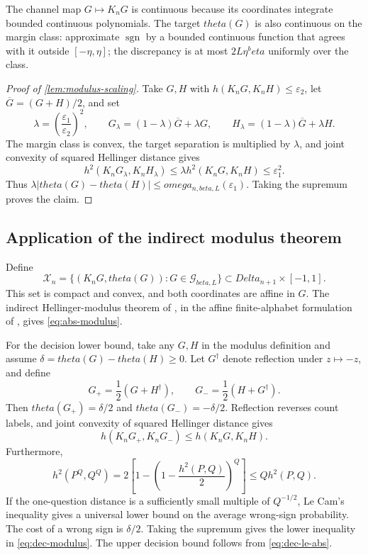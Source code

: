 \documentclass[11pt]{article}
\def\beta{beta}%
\def\theta{theta}%
\def\omega{omega}%
\def\Delta{Delta}%
\newcommand{\sgn}{\operatorname{sgn}}
\newcommand{\calG}{\mathcal G}
\newcommand{\eps}{\varepsilon}
\begin{document}
The channel map $G\mapsto K_nG$ is continuous because its coordinates integrate bounded continuous polynomials.  The target $\theta(G)$ is also continuous on the margin class: approximate $\sgn$ by a bounded continuous function that agrees with it outside $[-\eta,\eta]$; the discrepancy is at most $2L\eta^\beta$ uniformly over the class.

\begin{proof}[Proof of \cref{lem:modulus-scaling}]
Take $G,H$ with $h(K_nG,K_nH)\le\eps_2$, let $\overline G=(G+H)/2$, and set
\[
\lambda=\left(\frac{\eps_1}{\eps_2}\right)^2,
\qquad
G_\lambda=(1-\lambda)\overline G+\lambda G,
\qquad
H_\lambda=(1-\lambda)\overline G+\lambda H.
\]
The margin class is convex, the target separation is multiplied by $\lambda$, and joint convexity of squared Hellinger distance gives
\[
h^2(K_nG_\lambda,K_nH_\lambda)
\le
\lambda h^2(K_nG,K_nH)
\le\eps_1^2.
\]
Thus $\lambda|\theta(G)-\theta(H)|\le\omega_{n,\beta,L}(\eps_1)$.  Taking the supremum proves the claim.
\end{proof}

\subsection{Application of the indirect modulus theorem}

Define
\[
\mathcal X_n
=
\{(K_nG,\theta(G)):G\in\calG_{\beta,L}\}
\subset\Delta_{n+1}\times[-1,1].
\]
This set is compact and convex, and both coordinates are affine in $G$.  The indirect Hellinger-modulus theorem of \citet{DonohoLiuII}, in the affine finite-alphabet formulation of \citet{JuditskyNemirovski}, gives \eqref{eq:abs-modulus}.

For the decision lower bound, take any $G,H$ in the modulus definition and assume $\delta=\theta(G)-\theta(H)\ge0$.  Let $G^\dagger$ denote reflection under $z\mapsto-z$, and define
\[
G_+=\frac12(G+H^\dagger),
\qquad
G_-=\frac12(H+G^\dagger).
\]
Then $\theta(G_+)=\delta/2$ and $\theta(G_-)=-\delta/2$.  Reflection reverses count labels, and joint convexity of squared Hellinger distance gives
\[
h(K_nG_+,K_nG_-)
\le h(K_nG,K_nH).
\]
Furthermore,
\[
h^2(P^Q,Q^Q)
=2\left[1-\left(1-\frac{h^2(P,Q)}2\right)^Q\right]
\le Qh^2(P,Q).
\]
If the one-question distance is a sufficiently small multiple of $Q^{-1/2}$, Le Cam's inequality gives a universal lower bound on the average wrong-sign probability.  The cost of a wrong sign is $\delta/2$.  Taking the supremum gives the lower inequality in \eqref{eq:dec-modulus}.  The upper decision bound follows from \eqref{eq:dec-le-abs}.
\end{document}
